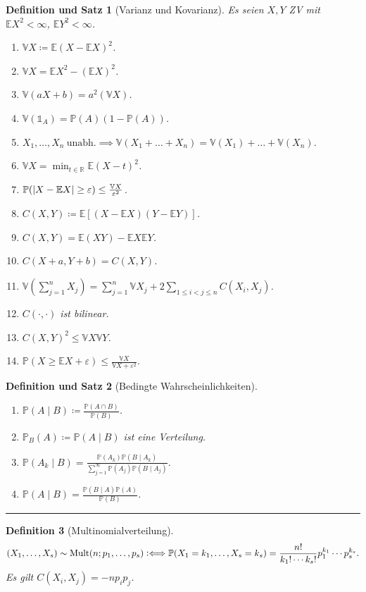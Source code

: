 \documentclass[a4paper]{article}
\newcounter{Sec}
\theoremstyle{marginbreak}
\newtheorem{definition}{Definition}[Sec]
\newtheorem{defsatz}[definition]{Definition und Satz}
\newcommand{\sep}{%
	\rule{\textwidth}{0.3pt}%
	\stepcounter{Sec}%
	}
\newcommand{\defiff}{\mathrel{\vcentcolon\Longleftrightarrow}}
\DeclareMathOperator{\Mult}{Mult}
\renewcommand{\P}{\mathbb{P}}
\newcommand{\R}{\mathbb{R}}
\newcommand{\E}{\mathbb{E}}
\newcommand{\V}{\mathbb{V}}
\begin{document}
	\begin{defsatz}[Varianz und Kovarianz]
		Es seien $X, Y$ ZV mit $\E X^2<\infty$, $\E Y^2<\infty$.
		\begin{enumerate}[label=(\alph*)]
			\item $\V X\coloneqq \E(X-\E X)^2$.
			\item $\V X=\E X^2 - (\E X)^2$.
			\item $\V(aX+b) = a^2(\V X)$.
			\item $\V(\mathds{1}_A) = \P(A)(1-\P(A))$.
			\item $X_1,\ldots,X_n~\text{unabh.}\implies \V(X_1+\dots+X_n)=\V(X_1)+\dots+\V(X_n)$.
			\item $\V X = \min_{t\in\R}\E(X-t)^2$.
			\item $\P(\abs{X-\E X}\geq\varepsilon)\leq\frac{\V X}{\varepsilon^2}$.
			\item $C(X, Y)\coloneqq \E[(X-\E X)(Y-\E Y)]$.
			\item $C(X, Y) = \E(XY) - \E X \E Y$.
			\item $C(X+a, Y+b) = C(X, Y)$.
			\item $\V(\sum_{j=1}^nX_j)=\sum_{j=1}^n\V X_j + 2\sum_{1\leq i<j\leq n} C(X_i, X_j)$.
			\item $C(\cdot,\cdot)$ ist bilinear.
			\item $C(X, Y)^2\leq\V X \V Y$.
			\item $\P(X\geq \E X+\varepsilon)\leq \frac{\V X}{\V X+\varepsilon^2}$.
		\end{enumerate}
	\end{defsatz}
	\begin{defsatz}[Bedingte Wahrscheinlichkeiten]
		\begin{enumerate}[label=(\alph*)]
			\item $\P(A\mid B)\coloneqq\frac{\P(A\cap B)}{\P(B)}$.
			\item $\P_B(A)\coloneqq \P(A\mid B)$ ist eine Verteilung.
			\item $\P(A_k\mid B)=\frac{\P(A_k)\P(B\mid A_k)}{\sum_{j=1}^\infty\P(A_j)\P(B\mid A_j)}$.
			\item $\P(A\mid B)=\frac{\P(B\mid A)\P(A)}{\P(B)}$.
		\end{enumerate}
	\end{defsatz}
	\sep
	\begin{definition}[Multinomialverteilung]
		\begin{equation*}
			(X_1,\ldots,X_s)\sim\Mult(n;p_1,\ldots,p_s)\defiff
			\P(X_1=k_1,\ldots,X_s=k_s)=\frac{n!}{k_1!\cdots k_s!}p_1^{k_1}\cdots p_s^{k_s}.
		\end{equation*}
		Es gilt $C(X_i, X_j)=-np_ip_j$.
	\end{definition}
\end{document}
